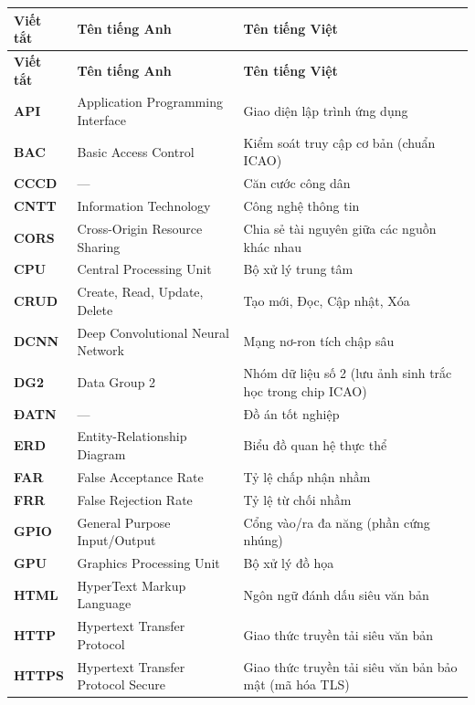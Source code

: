 \documentclass[../DoAn.tex]{subfiles}
\begin{document}
\begin{longtable}{|l|p{6.5cm}|p{6.5cm}|}
\hline
\textbf{Viết tắt} & \textbf{Tên tiếng Anh} & \textbf{Tên tiếng Việt} \\ \hline 
\endfirsthead

\hline
\textbf{Viết tắt} & \textbf{Tên tiếng Anh} & \textbf{Tên tiếng Việt} \\ \hline 
\endhead

\hline
\endfoot

\hline
\endlastfoot

\textbf{API} & Application Programming Interface & Giao diện lập trình ứng dụng \\ \hline
\textbf{BAC} & Basic Access Control & Kiểm soát truy cập cơ bản (chuẩn ICAO) \\ \hline
\textbf{CCCD} & — & Căn cước công dân \\ \hline
\textbf{CNTT} & Information Technology & Công nghệ thông tin \\ \hline
\textbf{CORS} & Cross-Origin Resource Sharing & Chia sẻ tài nguyên giữa các nguồn khác nhau \\ \hline
\textbf{CPU} & Central Processing Unit & Bộ xử lý trung tâm \\ \hline
\textbf{CRUD} & Create, Read, Update, Delete & Tạo mới, Đọc, Cập nhật, Xóa \\ \hline
\textbf{DCNN} & Deep Convolutional Neural Network & Mạng nơ-ron tích chập sâu \\ \hline
\textbf{DG2} & Data Group 2 & Nhóm dữ liệu số 2 (lưu ảnh sinh trắc học trong chip ICAO) \\ \hline
\textbf{ĐATN} & — & Đồ án tốt nghiệp \\ \hline
\textbf{ERD} & Entity-Relationship Diagram & Biểu đồ quan hệ thực thể \\ \hline
\textbf{FAR} & False Acceptance Rate & Tỷ lệ chấp nhận nhầm \\ \hline
\textbf{FRR} & False Rejection Rate & Tỷ lệ từ chối nhầm \\ \hline
\textbf{GPIO} & General Purpose Input/Output & Cổng vào/ra đa năng (phần cứng nhúng) \\ \hline
\textbf{GPU} & Graphics Processing Unit & Bộ xử lý đồ họa \\ \hline
\textbf{HTML} & HyperText Markup Language & Ngôn ngữ đánh dấu siêu văn bản \\ \hline
\textbf{HTTP} & Hypertext Transfer Protocol & Giao thức truyền tải siêu văn bản \\ \hline
\textbf{HTTPS} & Hypertext Transfer Protocol Secure & Giao thức truyền tải siêu văn bản bảo mật (mã hóa TLS) \\ \hline

\end{longtable}
\end{document}
